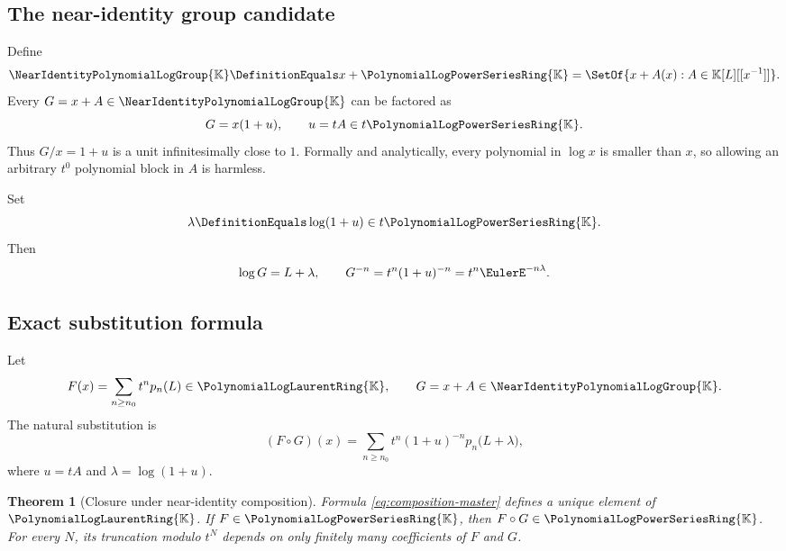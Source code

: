 \documentclass[11pt]{article}
\theoremstyle{pltheorem}
\newtheorem{theorem}{Theorem}[section]
\newcommand{\K}{\mathbb K}
\newcommand{\PL}{\PolynomialLogPowerSeriesRing{\K}}
\newcommand{\PLL}{\PolynomialLogLaurentRing{\K}}
\newcommand{\Gnear}{\NearIdentityPolynomialLogGroup{\K}}
\newcommand{\compose}{\mathbin{\circ}}
\begin{document}
\subsection{The near-identity group candidate}

Define
\begin{equation}\label{eq:Gnear-def}
 \Gnear\DefinitionEquals x+\PL
 =\SetOf{x+A(x):A\in\K[L][[x^{-1}]]}.
\end{equation}
Every \(G=x+A\in\Gnear\) can be factored as
\begin{equation}\label{eq:G-factor}
 G=x(1+u),
 \qquad
 u=tA\in t\PL.
\end{equation}
Thus \(G/x=1+u\) is a unit infinitesimally close to \(1\).  Formally and analytically, every polynomial in \(\log x\) is smaller than \(x\), so allowing an arbitrary \(t^0\) polynomial block in \(A\) is harmless.

Set
\begin{equation}\label{eq:lambda-def}
 \lambda\DefinitionEquals\log(1+u)\in t\PL.
\end{equation}
Then
\begin{equation}\label{eq:logG-and-inverseG}
 \log G=L+\lambda,
 \qquad
 G^{-n}=t^n(1+u)^{-n}=t^n\EulerE^{-n\lambda}.
\end{equation}

\subsection{Exact substitution formula}

Let
\begin{equation}\label{eq:F-general-composition}
 F(x)=\sum_{n\ge n_0}t^np_n(L)\in\PLL,
 \qquad
 G=x+A\in\Gnear.
\end{equation}
The natural substitution is
\begin{equation}\label{eq:composition-master}
 (F\compose G)(x)
 =\sum_{n\ge n_0}t^n(1+u)^{-n}
 p_n\bigl(L+\lambda\bigr),
\end{equation}
where \(u=tA\) and \(\lambda=\log(1+u)\).

\begin{theorem}[Closure under near-identity composition]\label{thm:composition-closure}
Formula \cref{eq:composition-master} defines a unique element of \(\PLL\).  If \(F\in\PL\), then \(F\compose G\in\PL\).  For every \(N\), its truncation modulo \(t^N\) depends on only finitely many coefficients of \(F\) and \(G\).
\end{theorem}
\end{document}
